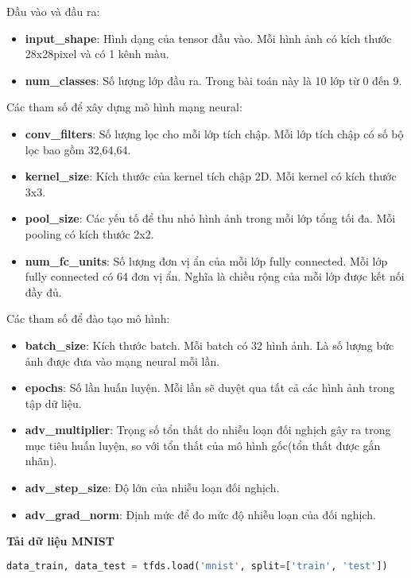 Đầu vào và đầu ra:
\begin{itemize}
    \item \textbf{input\_shape}: Hình dạng của tensor đầu vào. Mỗi hình ảnh có kích thước 28x28pixel và có 1 kênh màu.
    \item \textbf{num\_classes}: Số lượng lớp đầu ra. Trong bài toán này là 10 lớp từ 0 đến 9.
\end{itemize}

Các tham số để xây dựng mô hình mạng neural:
\begin{itemize}
    \item \textbf{conv\_filters}: Số lượng lọc cho mỗi lớp tích chập. Mỗi lớp tích chập có số bộ lọc bao gồm 32,64,64.
    \item \textbf{kernel\_size}: Kích thước của kernel tích chập 2D. Mỗi kernel có kích thước 3x3.
    \item \textbf{pool\_size}: Các yếu tố để thu nhỏ hình ảnh trong mỗi lớp tổng tối đa. Mỗi pooling có kích thước 2x2.
    \item \textbf{num\_fc\_units}: Số lượng đơn vị ẩn của mỗi lớp fully connected. Mỗi lớp fully connected có 64 đơn vị ẩn. Nghĩa là chiều rộng của mỗi lớp được kết nối đầy đủ.
\end{itemize}

Các tham số để đào tạo mô hình:
\begin{itemize}
    \item \textbf{batch\_size}: Kích thước batch. Mỗi batch có 32 hình ảnh. Là số lượng bức ảnh được đưa vào mạng neural mỗi lần.
    \item \textbf{epochs}: Số lần huấn luyện. Mỗi lần sẽ duyệt qua tất cả các hình ảnh trong tập dữ liệu.
    \item \textbf{adv\_multiplier}: Trọng số tổn thất do nhiễu loạn đối nghịch gây ra trong mục tiêu huấn luyện, so với tổn thất của mô hình gốc(tổn thất được gắn nhãn).
    \item \textbf{adv\_step\_size}: Độ lớn của nhiễu loạn đối nghịch.
    \item \textbf{adv\_grad\_norm}: Định mức để đo mức độ nhiễu loạn của đối nghịch. %
\end{itemize}

\textbf{Tải dữ liệu MNIST}
\begin{lstlisting}[language=Python]
    data_train, data_test = tfds.load('mnist', split=['train', 'test'])
\end{lstlisting}

